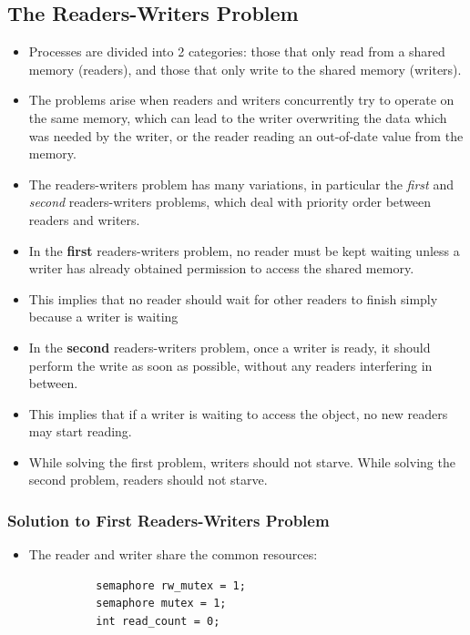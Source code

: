 \documentclass{article}
\theoremstyle{plain}
\theoremstyle{definition}
\begin{document}
\subsection{The Readers-Writers Problem}
\begin{itemize}
    \item Processes are divided into 2 categories: those that only read from a shared memory (readers), and those that only write to the shared memory (writers).
    
    \item The problems arise when readers and writers concurrently try to operate on the same memory, which can lead to the writer overwriting the data which was needed by the writer, or the reader reading an out-of-date value from the memory. 
    
    \item The readers-writers problem has many variations, in particular the \textit{first} and \textit{second} readers-writers problems, which deal with priority order between readers and writers.
    
    \item In the \textbf{first} readers-writers problem, no reader must be kept waiting unless a writer has already obtained permission to access the shared memory.
    
    \item This implies that no reader should wait for other readers to finish simply because a writer is waiting
    
    \item In the \textbf{second} readers-writers problem, once a writer is ready, it should perform the write as soon as possible, without any readers interfering in between. 
    
    \item This implies that if a writer is waiting to access the object, no new readers may start reading.
    
    \item While solving the first problem, writers should not starve. While solving the second problem, readers should not starve. 
\end{itemize}

\subsubsection{Solution to First Readers-Writers Problem}
\begin{itemize}
    \item The reader and writer share the common resources:
\end{itemize}
\begin{figure}[!h]
    \begin{verbatim}
        semaphore rw_mutex = 1;
        semaphore mutex = 1;
        int read_count = 0;
    \end{verbatim}
\end{figure}
\end{document}

